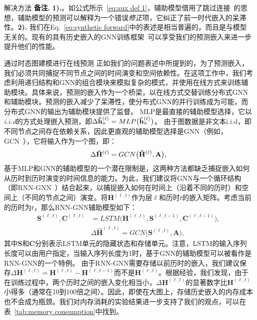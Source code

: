 \begin{section}{解决方法}
    \textbf{备注.} \textbf{1).}。如公式所示~\ref{eq:aux def 1}，辅助模型借用了跳过连接~\cite{he2016identity}的思想，辅助模型的预测可以解释为一个错误\emph{修正}项，它纠正了前一时代嵌入的呆滞性。\textbf{2).} 我们在Eq.~\ref{eq:synthetic forward}中的表述是相当普遍的，而且是与模型无关的。现有的具有历史嵌入的GNN训练框架~\cite{chen2018stochastic,fey2021gnnautoscale,wan2022pipegcn}可以享受我们的预测嵌入来进一步提升他们的性能。

    \begin{subsection}{通过时态图建模进行在线预测}
        正如我们的问题表述中所提到的，为了预测嵌入，我们必须共同捕捉不同节点之间的时间演变和空间依赖性。在这项工作中，我们考虑利用递归结构和GNN的组合模块来模拟复杂的模式，并使用在线方式来训练辅助模块。具体来说，预测的嵌入作为一个桥梁，以在线方式交替训练分布式GNN和辅助模块。预测的嵌入减少了呆滞性，使分布式GNN的并行训练成为可能，而分布式GNN的输出为辅助模块提供了监督。
        MLP是最直接的辅助模型选择，它以\textit{i.i.d}的方式处理嵌入预测，即$\Delta\mathbf{\hat{h}}^{(\ell)}_u = MLP\big(\mathbf{\Tilde{h}}^{(\ell)}_u\big)$。
由于图数据是非文本{i.i.d}，即不同节点之间存在依赖关系，因此更直观的辅助模型选择是GNN（例如，GCN~\cite{kipf2016semi}），它将输入作为一个图，即：  
\begin{equation}
    \Delta\mathbf{\hat{H}}^{(\ell)} = GCN\big(\mathbf{\Tilde{H}}^{(\ell)}, \mathbf{A}\big),
\label{eq:aux gnn}
\end{equation} 
基于MLP和GNN的辅助模型的一个潜在限制是，这两种方法都缺乏捕捉嵌入如何从历时到历时演变的时间信息的能力。为此，我们建议将GNN与一个循环结构（即RNN-GNN~\cite{wu2022graph}）结合起来，以捕捉嵌入如何在时间上（沿着不同的历时）和空间上（不同的节点之间）演变。将$\mathbf{H}^{(\ell,t)}$作为层$\ell$和历时$t$的嵌入矩阵。考虑当前的历时为$t$，那么RNN-GNN辅助模型如下：
\begin{equation}
    \begin{split}
        \mathbf{S}^{(\ell,t)}, \mathbf{C}^{(\ell,t)} &= LSTM\big(\mathbf{H}^{(\ell,t)}, \mathbf{S}^{(\ell,t-1)}, \mathbf{C}^{(\ell,t-1)}  \big), \\
        &\Delta\mathbf{\hat{H}}^{(\ell,t)} = GCN\big(\mathbf{S}^{(\ell,t)}, \mathbf{A}\big),
    \end{split}
\label{eq:aux rnn-gnn}
\end{equation}
其中$\mathbf{S}$和$\mathbf{C}$分别表示LSTM单元的隐藏状态和存储单元。注意，LSTM的输入序列长度可以由用户指定，当输入序列长度为1时，基于GNN的辅助模型可以被看作是RNN-GNN的一个特例。
由于RNN-GNN需要存储以前历时的嵌入，我们建议保存$\Delta\mathbf{H}^{(\ell,t)}=\mathbf{H}^{(\ell,t)}-\mathbf{H}^{(\ell,t-1)}$而不是$\mathbf{H}^{(\ell,t)}$。根据经验，我们发现，由于在训练过程中，两个历时之间的嵌入变化相当小，$\Delta\mathbf{H}^{(\ell,t)}$的显著数字比$\mathbf{H}^{(\ell,t)}$小得多（通常在10到100倍之间）。因此，即使在大图上，存储历史嵌入的内存成本也不会成为瓶颈。我们对内存消耗的实验结果进一步支持了我们的观点，可以在表~\ref{tab:memory consumption}中找到。
\end{subsection}



\end{section}
